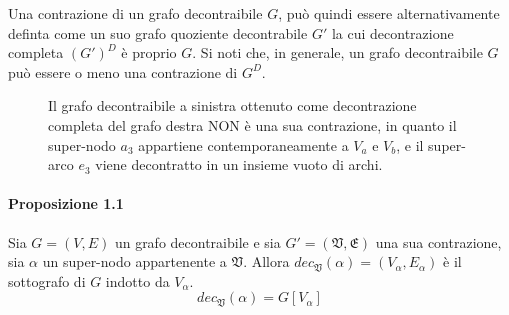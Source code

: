     Una contrazione di un grafo decontraibile $G$, pu\`o quindi essere alternativamente definta come un suo grafo
    quoziente decontrabile $G'$ la cui decontrazione completa $(G')^D$ \`e proprio $G$.
    \newline
    Si noti che, in generale, un grafo decontraibile $G$ pu\`o essere o meno una contrazione di $G^D$.

\begin{figure}[H]
    \centering
    
    \caption{Il grafo decontraibile a sinistra ottenuto come decontrazione completa del grafo destra NON \`e una
    sua contrazione, in quanto il super-nodo $a_3$ appartiene contemporaneamente a $V_a$ e $V_b$,
        e il super-arco $e_3$ viene decontratto in un insieme vuoto di archi.}
    \label{fig:example3}
\end{figure}

    \paragraph{Proposizione 1.1}
    Sia $G=(V, E)$ un grafo decontraibile e sia $G\mathcal{'} = (\mathfrak{V}, \mathfrak{E})$ una sua contrazione,
    sia $\alpha$ un super-nodo appartenente a $\mathfrak{V}$.
    Allora $dec_{\mathfrak{V}}(\alpha) = (V_\alpha, E_\alpha)$ \`e il sottografo di $G$ indotto da $V_\alpha$.
    \begin{equation*}
        dec_{\mathfrak{V}}(\alpha) = G[V_\alpha]
    \end{equation*}

